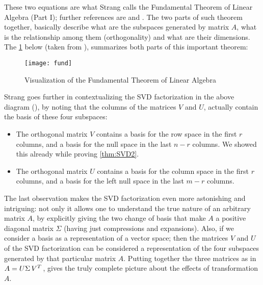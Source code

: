 These two equations are what Strang calls the Fundamental Theorem of
Linear Algebra (Part I); further references are \cite{strang88} and
\cite{strang93}. The two parts of such theorem together, basically
describe what are the subspaces generated by matrix $A$, what is the
relationship among them (orthogonality) and what are their
dimensions. The \cref{fig:fund} below (taken from
\cite{strang88}), summarizes both parts of this important theorem:
\\

\begin{figure}[h]
  \centering
  \texttt{[image: fund]}
  \caption{Visualization of the Fundamental Theorem of Linear Algebra}
  \label{fig:fund}
\end{figure}
\hfill

Strang goes further in contextualizing the SVD factorization in the
above diagram (\cite{strang93}), by noting that the columns of the
matrices $V$ and $U$, actually contain the basis of these four
subspaces: 

\begin{itemize}
\item The orthogonal matrix $V$ contains a basis for the row space
   in the first $r$ columns, and a basis for the null
  space  in the last $n-r$ columns. We showed this already while
  proving \cref{thm:SVD2}. 
\item The orthogonal matrix $U$ contains a basis for the column space
   in the first $r$ columns, and a basis for the left null
  space  in the last $m-r$ columns. 
\end{itemize}
\hfill

The last observation makes the SVD factorization even more astonishing
and intriguing: not only it allows one to understand the true nature of
an arbitrary matrix $A$, by explicitly giving the two change of basis
that make $A$ a positive diagonal matrix $\Sigma$ (having just
compressions and expansions). Also, if we consider a basis as a 
representation of a vector space; then the matrices $V$ and $U$ of the
SVD factorization can be 
considered a representation of the four subspaces generated by that
particular matrix $A$. Putting together the three matrices as in $A =
U\Sigma\,{V}^{T}\,$, gives the truly complete picture about the effects
of transformation $A$. 

